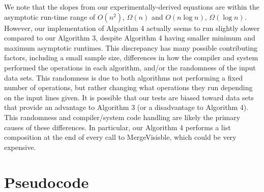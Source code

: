 \documentclass{article}
\begin{document}
We note that the slopes from our experimentally-derived equations are within the asymptotic run-time range of $O(n^2)$, $\Omega(n)$ and $O(n\log n)$, $\Omega(\log n)$.  However, our implementation of Algorithm 4 actually seems to run slightly slower compared to our Algorithm 3, despite Algorithm 4 having smaller minimum and maximum asymptotic runtimes.  This discrepancy has many possible contributing factors, including a small sample size, differences in how the compiler and system performed the operations in each algorithm, and/or the randomness of the input data sets.  This randomness is due to both algorithms not performing a fixed number of operations, but rather changing what operations they run depending on the input lines given.  It is possible that our tests are biased toward data sets that provide an advantage to Algorithm 3 (or a disadvantage to Algorithm 4).  This randomness and compiler/system code handling are likely the primary causes of these differences. In particular, our Algorithm 4 performs a list composition at the end of every call to MergeVisisble, which could be very expensive.

\pagebreak

\section*{Pseudocode}

\end{document}
